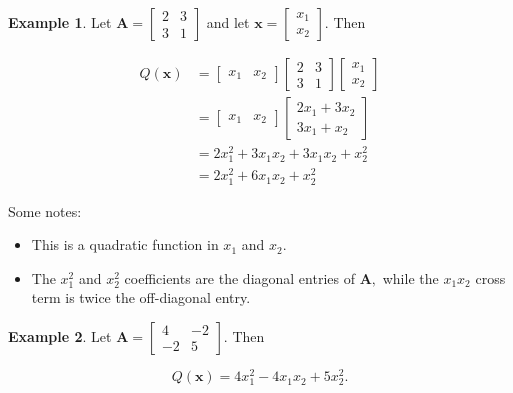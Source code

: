 \documentclass[
]{book}
\theoremstyle{definition}
\theoremstyle{definition}
\newtheorem{example}{Example}[chapter]
\theoremstyle{definition}
\theoremstyle{definition}
\theoremstyle{remark}
\begin{document}
\begin{examplebox}

\begin{example}

Let \(\mathbf{A}=\begin{bmatrix}2 & 3\\3 & 1\end{bmatrix}\) and let \(\mathbf{x}=\begin{bmatrix}x_1\\x_2\end{bmatrix}\). Then

\begin{align*}
Q(\mathbf{x})&=\begin{bmatrix}x_1 & x_2\end{bmatrix}\begin{bmatrix}2 & 3\\3 & 1\end{bmatrix}\begin{bmatrix}x_1\\x_2\end{bmatrix}\\
&=\begin{bmatrix}x_1 & x_2\end{bmatrix}\begin{bmatrix}2x_1+3x_2\\3x_1+x_2\end{bmatrix}\\
&=2x_1^2+3x_1x_2+3x_1x_2+x_2^2\\
&=2x_1^2+6x_1x_2+x_2^2
\end{align*}

Some notes:

\begin{itemize}
\item
  This is a quadratic function in \(x_1\) and \(x_2\).
\item
  The \(x_1^2\) and \(x_2^2\) coefficients are the diagonal entries of \(\mathbf{A},\) while the \(x_1x_2\) cross term is twice the off-diagonal entry.
\end{itemize}

\end{example}

\end{examplebox}

\begin{examplebox}

\begin{example}
Let \(\mathbf{A}=\begin{bmatrix}4 & -2\\-2 & 5\end{bmatrix}\). Then

\[Q(\mathbf{x})=4x_1^2-4x_1x_2+5x_2^2.\]
\end{example}

\end{examplebox}
\end{document}
